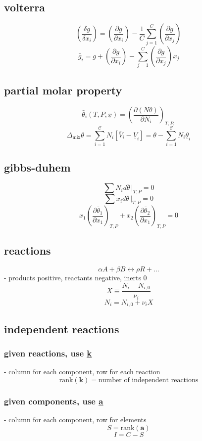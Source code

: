 \documentclass{article}
\begin{document}
\begin{minipage}[t]{0.48\textwidth}
    \subsection*{volterra}
    \[\left(\frac{ \delta g }{ \delta x_{i} } \right) = \left(\frac{ \partial g }{ \partial x_{i} } \right)_{} - \frac{1}{C} \sum_{j=1}^{C} \left(\frac{ \partial g }{ \partial x_{j} } \right)_{}  \]
    \[\bar{g}_{i} = g + \left(\frac{ \partial g }{ \partial x_{i} } \right)_{} - \sum_{j=1}^C \left(\frac{ \partial g }{ \partial x_{j} } \right)_{} x_{j}   \]
    \subsection*{partial molar property} 
    \[ \bar{\theta}_i (T,P,\underline{x}) = \left( \frac{\partial ( N\underline\theta)}{\partial N_i} \right)_{T,P,} \]
    \[{ \Delta_{\text{mix}} \theta = \sum_{i=1}^{\mathcal{C}} N_i \left[ \bar V_i - \underline V_i \right] } = \theta - \sum_{i=1}^{\mathcal{C}} N_i \underline\theta_i \]
    \subsection*{gibbs-duhem}
    \[ \sum N_{i} d\bar{\theta}\,\bigl\lvert_{T,P} = 0  \]
    \[ \sum x_{i} d\bar{\theta}\,\bigl\lvert_{T,P} = 0 \]
    \[x_{1}\left(\frac{ \partial \bar{\theta}_{1} }{ \partial x_{1} } \right)_{T,P} +x_{2}\left(\frac{ \partial \bar{\theta}_{2} }{ \partial x_{1} } \right)_{T,P} = 0\]
    \subsection*{reactions}
    \[\alpha A + \beta B \longleftrightarrow \rho R + \dots\]
    - products positive, reactants negative, inerts 0
    \[X \equiv \frac{N_{i} - N_{i,0}}{\nu_{i}}\]
    \[N_{i} = N_{i,0} + \nu_{i}X\]
    \subsection*{independent reactions}
    \subsubsection*{given reactions, use \underline{\underline{k}}}
    - column for each component, row for each reaction
    \[\text{rank}(\mathbf{k}) = \text{number of independent reactions}\]
    \subsubsection*{given components, use \underline{\underline{a}}}
    - column for each component, row for elements
    \[S = \text{rank}(\mathbf{a})\]
    \[I = C - S\]
\end{minipage}
\pagebreak
\end{document}

